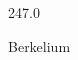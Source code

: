 \documentclass[12pt]{article}
\begin{document}
\hfill{}
\vfill
\begin{center}
  {\fontsize{50}{60}
  }

  247.0

Berkelium
\end{center}
\vfill
\end{document}
